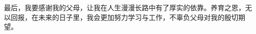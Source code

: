 \documentclass[nomlist,masters,openany]{seuthesix}
\begin{document}
最后，我要感谢我的父母，让我在人生漫漫长路中有了厚实的依靠。养育之恩，无以回报，在未来的日子里，我会更加努力学习与工作，不辜负父母对我的殷切期望。

\quad

\quad




\appendix

\end{document}
